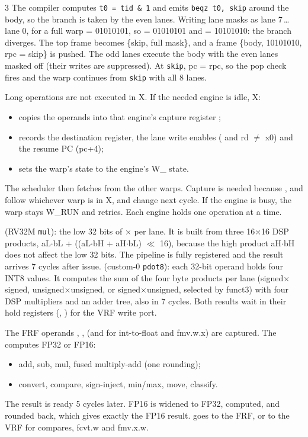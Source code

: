 \begin{multicols*}{3}
The compiler computes \texttt{t0 = tid \& 1} and emits \texttt{beqz t0, skip} around the body, so the branch is taken by the even lanes. Writing lane masks as lane 7\,\ldots\,lane 0, for a full warp  = 01010101, so  = 01010101 and  = 10101010: the branch diverges. The top frame becomes \{skip, full mask\}, and a frame \{body, 10101010, rpc = skip\} is pushed. The odd lanes execute the body with the even lanes masked off (their writes are suppressed). At \texttt{skip}, pc = rpc, so the pop check fires and the warp continues from \texttt{skip} with all 8 lanes.

Long operations are not executed in X. If the needed engine is idle, X:
\begin{itemize}
\item copies the operands into that engine's capture register ;
\item records the destination register, the lane write enables ( and rd $\neq$ x0) and the resume PC (pc+4);
\item sets the warp's state to the engine's W\_ state.
\end{itemize}
The scheduler then fetches from the other warps. Capture is needed because ,  and  follow whichever warp is in X, and change next cycle. If the engine is busy, the warp stays W\_RUN and retries. Each engine holds one operation at a time.

 (RV32M \texttt{mul}): the low 32 bits of $\times$ per lane. It is built from three 16$\times$16 DSP products, aL$\cdot$bL + ((aL$\cdot$bH + aH$\cdot$bL) $\ll$ 16), because the high product aH$\cdot$bH does not affect the low 32 bits. The pipeline is fully registered and the result arrives 7 cycles after issue.
 (custom-0 \texttt{pdot8}): each 32-bit operand holds four INT8 values. It computes the sum of the four byte products per lane (signed$\times$signed, unsigned$\times$unsigned, or signed$\times$unsigned, selected by funct3) with four DSP multipliers and an adder tree, also in 7 cycles.
Both results wait in their hold registers (, ) for the VRF write port.

The FRF operands , ,  (and  for int-to-float and fmv.w.x) are captured. The  computes FP32 or FP16:
\begin{itemize}
\item add, sub, mul, fused multiply-add (one rounding);
\item convert, compare, sign-inject, min/max, move, classify.
\end{itemize}
The result  is ready 5 cycles later. FP16 is widened to FP32, computed, and rounded back, which gives exactly the FP16 result.  goes to the FRF, or to the VRF for compares, fcvt.w and fmv.x.w.


\end{multicols*}
